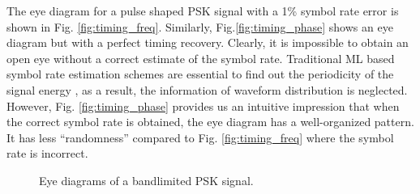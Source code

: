 \documentclass[conference, onecolumn]{IEEEtran}
\begin{document}
The eye diagram for a pulse shaped PSK signal with a 1\% symbol rate error is shown in Fig. \ref{fig:timing_freq}. 
Similarly, Fig.\ref{fig:timing_phase} shows an eye diagram but with a perfect timing recovery. 
Clearly, it is impossible to obtain an open eye without a correct estimate of the symbol rate.
Traditional ML based symbol rate estimation schemes are essential to find out the periodicity of the signal energy \cite{Mosquera2008},
as a result, the information of waveform distribution is neglected.
However, Fig. \ref{fig:timing_phase} provides us an intuitive impression that when the correct symbol rate is obtained, the eye diagram has a well-organized pattern. 
It has less ``randomness'' compared to Fig. \ref{fig:timing_freq} where the symbol rate is incorrect.

\begin{figure}[htbp]
  \centering
  \hspace{0.2in} %
  
    \caption{Eye diagrams of a bandlimited PSK signal. }
    \label{fig:timing} %
\end{figure}
\end{document}
